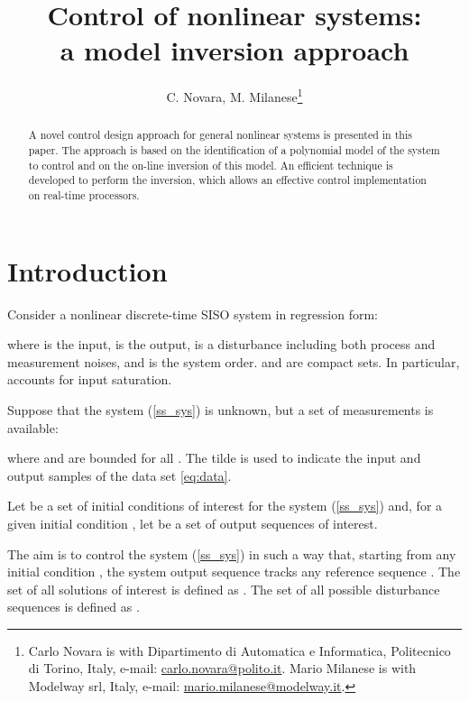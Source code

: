 \documentclass[twocolumn,english,journal]{IEEEtran}
\begin{document}
\title{Control of nonlinear systems:\\
a model inversion approach}


\author{C. Novara, M. Milanese\thanks{Carlo Novara is with Dipartimento di Automatica e Informatica, Politecnico
di Torino, Italy, e-mail: \protect\href{http://carlo.novara@polito.it}{carlo.novara@polito.it}.
Mario Milanese is with Modelway srl, Italy, e-mail: \protect\href{http://mario.milanese@modelway.it}{mario.milanese@modelway.it}.}}
\maketitle
\begin{abstract}
A novel control design approach for general nonlinear systems is presented
in this paper. The approach is based on the identification of a polynomial
model of the system to control and on the on-line inversion of this
model. An efficient technique is developed to perform the inversion,
which allows an effective control implementation on real-time processors.
\end{abstract}

\section{Introduction}

\label{sec:ibc_approach}

Consider a nonlinear discrete-time SISO system in regression form:


where  is the input, 
is the output, is a disturbance
including both process and measurement noises, and  is the system
order.  and  are compact sets. In particular, 
accounts for input saturation.

Suppose that the system (\ref{ss_sys}) is unknown, but a set of measurements
is available:

where  and  are bounded for all .
The tilde is used to indicate the input and output samples of the
data set \eqref{eq:data}.

Let  be a set of initial
conditions of interest for the system (\ref{ss_sys}) and, for a given
initial condition , let 
be a set of output sequences of interest.

The aim is to control the system (\ref{ss_sys}) in such a way that,
starting from any initial condition ,
the system output sequence 
tracks any reference sequence .
The set of all solutions of interest is defined as .
The set of all possible disturbance sequences is defined as .
\end{document}
